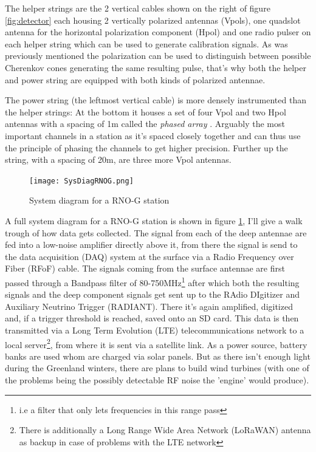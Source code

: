 The helper strings are the 2 vertical cables shown on the right of figure
\ref{fig:detector} each housing 2 vertically polarized antennas (Vpols), one
quadslot antenna for the horizontal polarization component (Hpol) and one radio
pulser on each helper string which can be used to generate calibration signals.
As was previously mentioned the polarization can be used to
distinguish between possible Cherenkov cones generating the same resulting
pulse, that's why both the helper and power string are equipped with both kinds
of polarized antennae.

The power string (the leftmost vertical cable) is more densely instrumented
than the helper strings: At the bottom it houses a set of four Vpol and two
Hpol antennas with a spacing of 1m called the \textit{phased array}\cite{Allison_2019}
. Arguably
the most important channels in a station as it's spaced closely together and
can thus use the principle of phasing the channels to get higher precision.
Further up the string, with a spacing of 20m, are three more Vpol antennas.
\begin{figure}
  \centering
  \texttt{[image: SysDiagRNOG.png]}
  \caption{System diagram for a RNO-G station }
  \label{fig:SysDiag}
\end{figure}

A full system diagram for a RNO-G station is shown in figure \ref{fig:SysDiag},
I'll give a walk trough of how data gets collected.  The signal from each of
the deep antennae are fed into a low-noise amplifier directly above it, from
there the signal is send to the data acquisition (DAQ) system at the surface
via a Radio Frequency over Fiber (RFoF) cable.  The signals coming from the
surface antennae are first passed through a Bandpass filter of
80-750MHz\footnote{i.e a filter that only lets frequencies in this range pass}
after which both the resulting signals and the deep component signals get sent
up to the RAdio DIgitizer and Auxiliary Neutrino Trigger (RADIANT). There it's
again amplified, digitized and, if a trigger threshold is reached, saved onto
an SD card. This data is then transmitted via a Long Term Evolution (LTE)
telecommunications network to a local server\footnote{There is additionally a
Long Range Wide Area Network (LoRaWAN) antenna as backup in case of problems
with the LTE network}, from where it is sent via a satellite link.
As a power source, battery banks are used whom are charged via solar panels.
But as there isn't enough light during the Greenland winters, there are plans to
build wind turbines (with one of the problems being the possibly detectable RF
noise the 'engine' would produce).

